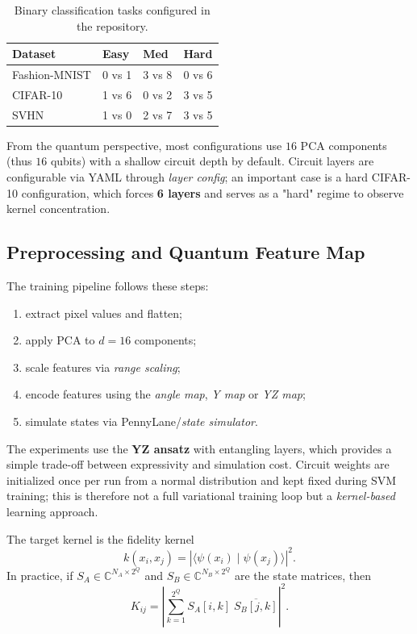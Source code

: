 \documentclass[10pt,twocolumn,letterpaper]{article}
\begin{document}
\begin{table}[t]
\centering
\caption{Binary classification tasks configured in the repository.}
\label{tab:tasks}
\small
\begin{tabular}{llll}
\toprule
\textbf{Dataset} & \textbf{Easy} & \textbf{Med} & \textbf{Hard} \\
\midrule
Fashion-MNIST & 0 vs 1 & 3 vs 8 & 0 vs 6 \\
CIFAR-10 & 1 vs 6 & 0 vs 2 & 3 vs 5 \\
SVHN & 1 vs 0 & 2 vs 7 & 3 vs 5 \\
\bottomrule
\end{tabular}
\end{table}

From the quantum perspective, most configurations use $16$ PCA components (thus $16$ qubits) with a shallow 
circuit depth by default. Circuit layers are configurable via YAML through \textit{layer config}; 
an important case is a hard CIFAR-10 configuration, which forces \textbf{6 layers} and serves as 
a "hard" regime to observe kernel concentration.

\subsection{Preprocessing and Quantum Feature Map}
The training pipeline follows these steps:
\begin{enumerate}
    \item extract pixel values and flatten;
    \item apply PCA to $d=16$ components;
    \item scale features via \textit{range scaling};
    \item encode features using the \textit{angle map}, \textit{Y map} or \textit{YZ map};
    \item simulate states via PennyLane/\textit{state simulator}.
\end{enumerate}

The experiments use the \textbf{YZ ansatz} with entangling layers, which provides a simple trade-off 
between expressivity and simulation cost. Circuit weights are initialized once per run from a normal 
distribution and kept fixed during SVM training; this is therefore not a full variational 
training loop but a \emph{kernel-based} learning approach.

The target kernel is the fidelity kernel
\[
k(x_i, x_j) = \left|\langle \psi(x_i) \mid \psi(x_j) \rangle \right|^2.
\]
In practice, if $S_A \in \mathbb{C}^{N_A \times 2^Q}$ and $S_B \in \mathbb{C}^{N_B \times 2^Q}$ are 
the state matrices, then
\[
K_{ij} = \left| \sum_{k=1}^{2^Q} S_A[i,k]\;\overline{S_B[j,k]} \right|^2.
\]
\end{document}
